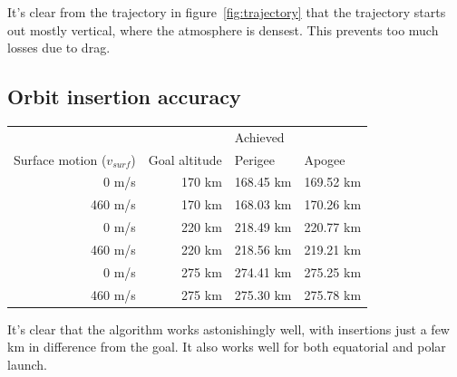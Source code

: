 \documentclass[11pt]{article}
\begin{document}
It's clear from the trajectory in figure~\ref{fig:trajectory} that the trajectory starts out mostly vertical, where the atmosphere is densest. This prevents too much losses due to drag.

\subsection{Orbit insertion accuracy}
\begin{center}
  \begin{tabular}{ r | r  | l  l  }
     &   &  Achieved  \\
    Surface motion ($v_{surf}$) & Goal altitude & Perigee & Apogee \\
    \hline
    0 m/s & 170 km & 168.45 km & 169.52 km \\
    460 m/s & 170 km & 168.03 km & 170.26 km \\
    \hline
    0 m/s & 220 km & 218.49 km & 220.77 km \\
    460 m/s & 220 km  & 218.56 km & 219.21 km \\
    \hline
    0 m/s & 275 km & 274.41 km & 275.25 km \\
    460 m/s & 275 km & 275.30 km & 275.78 km
  \end{tabular}
\end{center}
It's clear that the algorithm works astonishingly well, with insertions just a few km in difference from the goal. It also works well for both equatorial and polar launch.
\end{document}
